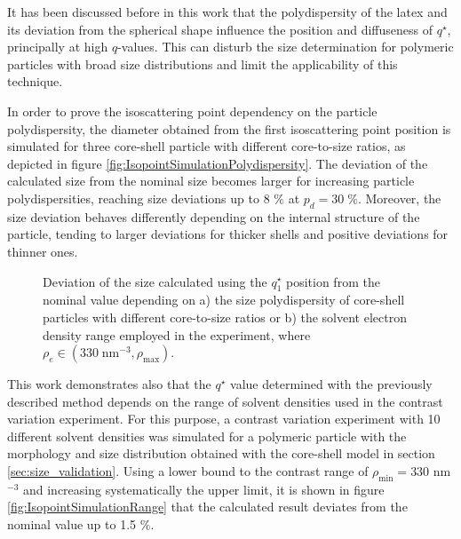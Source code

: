 It has been discussed before in this work that the polydispersity of the latex and its deviation from the spherical shape influence the position and diffuseness of $q^{\star}$, principally at high $q$-values. This can disturb the size determination for polymeric particles with broad size distributions and limit the applicability of this technique. 

In order to prove the isoscattering point dependency on the particle polydispersity, the diameter obtained from the first isoscattering point position is simulated for three core-shell particle with different core-to-size ratios, as depicted in figure \ref{fig:IsopointSimulationPolydispersity}. The deviation of the calculated size from the nominal size becomes larger for increasing particle polydispersities, reaching size deviations up to 8 $\%$ at $p_d = 30\;\%$. Moreover, the size deviation behaves differently depending on the internal structure of the particle, tending to larger deviations for thicker shells and positive deviations for thinner ones.

\begin{figure}%
	\centering
	\caption[Deviation of the size obtained with $q_1^{\star}$ from the nominal value.]{Deviation of the size calculated using the $q_1^{\star}$ position from the nominal value depending on a) the size polydispersity of core-shell particles with different core-to-size ratios or b) the solvent electron density range employed in the experiment, where  $\rho_e \in (330\;\mbox{nm}^{-3}, \rho_{\text{max}})$.}

\end{figure}

This work demonstrates also that the $q^{\star}$ value determined with the previously described method depends on the range of solvent densities used in the contrast variation experiment. For this purpose,  a contrast variation experiment with 10 different solvent densities was simulated for a polymeric particle with the morphology and size distribution obtained with the core-shell model in section \ref{sec:size_validation}. Using a lower bound to the contrast range of $\rho_{\text{min}}=330$ nm$^{-3}$ and increasing systematically the upper limit, it is shown in figure \ref{fig:IsopointSimulationRange} that the calculated result deviates from the nominal value up to 1.5 $\%$. 

